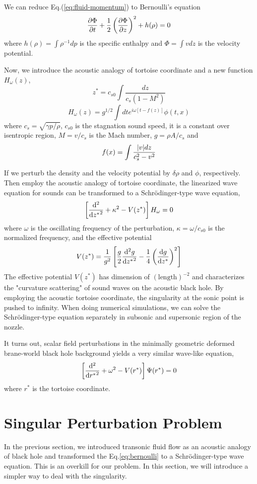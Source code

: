 We can reduce Eq.(\ref{eq:fluid-momentum}) to Bernoulli's equation
\begin{equation} \label{eq:bernoulli}
	\pdv{\Phi}{t} + \frac{1}{2}\left(\pdv{\Phi}{z}\right)^2 + h(\rho) = 0
\end{equation}
where $h(\rho)=\int \rho^{-1}dp$ is the specific enthalpy and $\Phi=\int vdz$ is the velocity potential.

Now, we introduce the acoustic analogy of tortoise coordinate and a new function $H_\omega(z)$,
\[ z^* = c_{s0} \int \frac{dz}{c_s(1-M^2)} \]
\[ H_\omega(z) = g^{1/2} \int dt e^{i\omega [t-f(z)]} \phi(t,x) \]
where $c_s = \sqrt{\gamma p/\rho}$, $c_{s0}$ is the stagnation sound speed, it is a constant over isentropic region, $M = v/c_s$ is the Mach number, $g=\rho A/c_s$ and
\[ f(x) = \int \frac{\abs{v} dz}{c_s^2 - v^2} \]

If we perturb the density and the velocity potential by $\delta\rho$ and $\phi$, respectively. Then employ the acoustic analogy of tortoise coordinate, the linearized wave equation for sounds can be transformed to a Schr{\"o}dinger-type wave equation,
\[ \left[\dv[2]{{z^*}} + \kappa^2 - V(z^*)\right] H_{\omega} = 0 \]
where $\omega$ is the oscillating frequency of the perturbation, $\kappa = \omega/c_{s0}$ is the normalized frequency, and the effective potential
\[ V(z^*) = \frac{1}{g^2} \left[ \frac{g}{2}\dv[2]{g}{{z^*}} - \frac{1}{4}\left(\dv{g}{z^*}\right)^2 \right] \]
The effective potential $V(z^*)$ has dimension of $(\text{length})^{-2}$ and characterizes the "curvature scattering" of sound waves on the acoustic black hole. \cite{okuzumi_sakagami_quasinormal_2007} By employing the acoustic tortoise coordinate, the singularity at the sonic point is pushed to infinity. When doing numerical simulations, we can solve the Schr{\"o}dinger-type equation separately in subsonic and supersonic region of the nozzle.

It turns out, scalar field perturbations in the minimally geometric deformed brane-world black hole background yields a very similar wave-like equation, \cite{da_rocha_black_2017}
\[ \left[ \dv[2]{{r^*}} + \omega^2 - V(r^*) \right] \Psi(r^*) = 0 \]
where $r^*$ is the tortoise coordinate.

\section{Singular Perturbation Problem}
In the previous section, we introduced transonic fluid flow as an acoustic analogy of black hole and transformed the Eq.\ref{eq:bernoulli} to a Schr{\"o}dinger-type wave equation. This is an overkill for our problem. In this section, we will introduce a simpler way to deal with the singularity.

